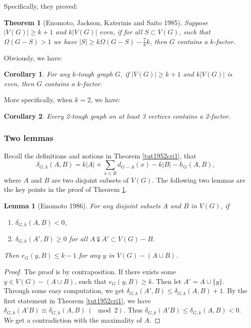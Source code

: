\documentclass[12pt]{report}
\newtheorem{theorem}{Theorem}
\newtheorem{lemma}{Lemma}
\newtheorem{corollary}{Corollary}
\begin{document}
Specifically, they proved:

\begin{theorem}[Enomoto, Jackson, Katerinis and Saito 1985]\label{kttokf19851}
Suppose $|V(G)|\ge k+1$ and $k|V(G)|$ even, if for all $S\subset V(G)$, such that $\Omega(G-S)>1$ we have $|S|\ge k\Omega(G-S)-\frac{7}{8}k$, then $G$ contains a $k$-factor.
\end{theorem}

Obviously, we have:
\begin{corollary}
For any $k$-tough graph $G$, if $|V(G)|\ge k+1$ and $k|V(G)|$ is even, then $G$ contains a $k$-factor.
\end{corollary}

More specifically, when $k=2$, we have:

\begin{corollary}\label{kttokfejks}
Every 2-tough graph on at least 3 vertices contains a 2-factor.
\end{corollary}




\subsubsection{Two lemmas}
Recall the definitions and notions in Theorem \ref{tut1952cri1}, that $$\delta_{G,k}(A,B)=k|A|+\sum_{x\in B}d_{G-A}(x)-k|B|-h_G(A,B),$$ where $A$ and $B$ are two disjoint subsets of $V(G)$.
The following two lemmas are the key points in the proof of Theorem \ref{kttokf19851}.
\begin{lemma}[Enomoto 1986]\label{lmbineno86}
For any disjoint subsets $A$ and $B$ in $V(G)$, if
\begin{enumerate}
\item $\delta_{G,k}(A,B)<0$,
\item $\delta_{G,k}(A',B)\ge0$ for all $A\subsetneqq A'\subset V(G)-B$.
\end{enumerate}
Then $e_G(y,B)\le k-1$ for any $y$ in $V(G)-(A\cup B)$.
\end{lemma}
\begin{proof}
The proof is by contraposition.
If there exists some $y\in V(G)-(A\cup B)$, such that $e_G(y,B)\ge k$. Then let $A'=A\cup\{y\}$. Through some easy computation, we get $\delta_{G,k}(A',B)\le\delta_{G,k}(A,B)+1$.
By the first statement in Theorem \ref{tut1952cri1}, we have $\delta_{G,k}(A'B)\equiv\delta_{G,k}(A,B)~(\mod 2)$. Thus $\delta_{G,k}(A'B)\le\delta_{G,k}(A,B)<0$. We get a contradiction with the maximality of $A$.
\end{proof}
\end{document}
